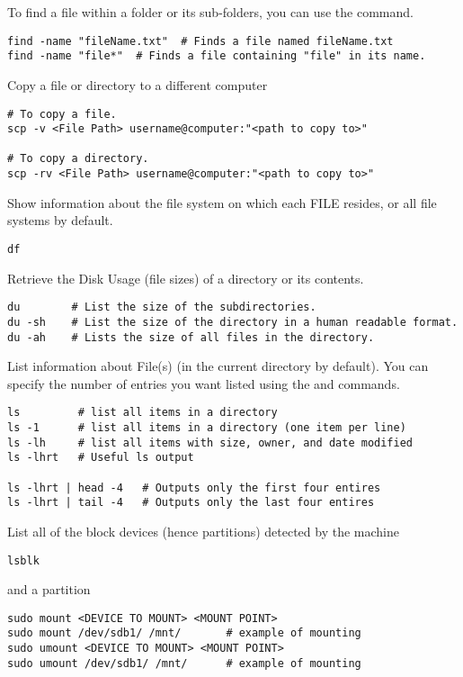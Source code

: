 To find a file within a folder or its sub-folders, you can use the  command.
\begin{lstlisting}
find -name "fileName.txt"  # Finds a file named fileName.txt
find -name "file*"  # Finds a file containing "file" in its name.
\end{lstlisting}

Copy a file or directory to a different computer
\begin{lstlisting}
# To copy a file.
scp -v <File Path> username@computer:"<path to copy to>"

# To copy a directory.
scp -rv <File Path> username@computer:"<path to copy to>"
\end{lstlisting}

Show information about the file system on which each FILE resides, or all file systems by default.
\begin{lstlisting}
df 
\end{lstlisting}

Retrieve the Disk Usage (file sizes) of a directory or its contents.
\begin{lstlisting}
du        # List the size of the subdirectories.
du -sh    # List the size of the directory in a human readable format.
du -ah    # Lists the size of all files in the directory.
\end{lstlisting}

List information about File(s) (in the current directory by default). You can specify the number of entries you want listed using the  and  commands.
\begin{lstlisting}
ls         # list all items in a directory
ls -1      # list all items in a directory (one item per line)
ls -lh     # list all items with size, owner, and date modified
ls -lhrt   # Useful ls output

ls -lhrt | head -4	 # Outputs only the first four entires
ls -lhrt | tail -4	 # Outputs only the last four entires
\end{lstlisting}

List all of the block devices (hence partitions) detected by the machine
\begin{lstlisting}
lsblk
\end{lstlisting}

 and  a partition
\begin{lstlisting}
sudo mount <DEVICE TO MOUNT> <MOUNT POINT>
sudo mount /dev/sdb1/ /mnt/       # example of mounting
sudo umount <DEVICE TO MOUNT> <MOUNT POINT>
sudo umount /dev/sdb1/ /mnt/      # example of mounting
\end{lstlisting}


